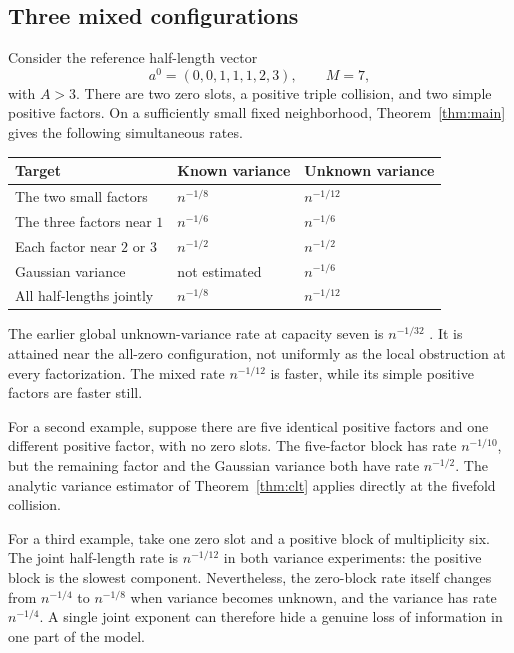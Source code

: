 \documentclass[11pt,a4paper]{article}
\numberwithin{equation}{section}
\theoremstyle{definition}
\theoremstyle{remark}
\begin{document}
\subsection{Three mixed configurations}
Consider the reference half-length vector
\begin{equation}
 a^0=(0,0,1,1,1,2,3),\qquad M=7,
 \label{eq:mixedexample}
\end{equation}
with $A>3$. There are two zero slots, a positive triple collision, and two
simple positive factors. On a sufficiently small fixed neighborhood,
Theorem~\ref{thm:main} gives the following simultaneous rates.
\begin{center}
\begin{tabular}{@{}lll@{}}
\toprule
Target & Known variance & Unknown variance\\
\midrule
The two small factors & $n^{-1/8}$ & $n^{-1/12}$\\
The three factors near $1$ & $n^{-1/6}$ & $n^{-1/6}$\\
Each factor near $2$ or $3$ & $n^{-1/2}$ & $n^{-1/2}$\\
Gaussian variance & not estimated & $n^{-1/6}$\\
All half-lengths jointly & $n^{-1/8}$ & $n^{-1/12}$\\
\bottomrule
\end{tabular}
\end{center}
The earlier global unknown-variance rate at capacity seven is $n^{-1/32}$
\cite{RepoGaussian}. It is attained near the all-zero configuration, not
uniformly as the local obstruction at every factorization. The mixed rate
$n^{-1/12}$ is faster, while its simple positive factors are faster still.

For a second example, suppose there are five identical positive factors and
one different positive factor, with no zero slots. The five-factor block has
rate $n^{-1/10}$, but the remaining factor and the Gaussian variance both have
rate $n^{-1/2}$. The analytic variance estimator of
Theorem~\ref{thm:clt} applies directly at the fivefold collision.

For a third example, take one zero slot and a positive block of multiplicity
six. The joint half-length rate is $n^{-1/12}$ in both variance experiments:
the positive block is the slowest component. Nevertheless, the zero-block
rate itself changes from $n^{-1/4}$ to $n^{-1/8}$ when variance becomes
unknown, and the variance has rate $n^{-1/4}$. A single joint exponent can
therefore hide a genuine loss of information in one part of the model.
\end{document}
